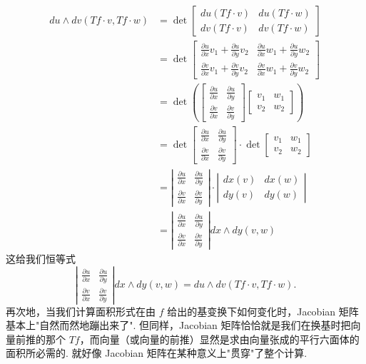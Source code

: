 \begin{align*}
du\wedge dv(Tf\cdot v,Tf\cdot w)
&=\det\begin{bmatrix}du(Tf\cdot v)&du(Tf\cdot w)\\dv(Tf\cdot v)&dv(Tf\cdot w)\end{bmatrix}\\
&=\det\begin{bmatrix}\frac{\partial u}{\partial x}v_1+\frac{\partial u}{\partial y}v_2&\frac{\partial u}{\partial x}w_1+\frac{\partial u}{\partial y}w_2\\[2pt]\frac{\partial v}{\partial x}v_1+\frac{\partial v}{\partial y}v_2&\frac{\partial v}{\partial x}w_1+\frac{\partial v}{\partial y}w_2\end{bmatrix}\\
&=\det\left(\begin{bmatrix}\frac{\partial u}{\partial x}&\frac{\partial u}{\partial y}\\\frac{\partial v}{\partial x}&\frac{\partial v}{\partial y}\end{bmatrix}\begin{bmatrix}v_1&w_1\\v_2&w_2\end{bmatrix}\right)\\
&=\det\begin{bmatrix}\frac{\partial u}{\partial x}&\frac{\partial u}{\partial y}\\\frac{\partial v}{\partial x}&\frac{\partial v}{\partial y}\end{bmatrix}\cdot\det\begin{bmatrix}v_1&w_1\\v_2&w_2\end{bmatrix}\\
&=\left|\begin{matrix}\frac{\partial u}{\partial x}&\frac{\partial u}{\partial y}\\\frac{\partial v}{\partial x}&\frac{\partial v}{\partial y}\end{matrix}\right|\cdot\left|\begin{matrix}dx(v)&dx(w)\\dy(v)&dy(w)\end{matrix}\right|\\
&=\left|\begin{matrix}\frac{\partial u}{\partial x}&\frac{\partial u}{\partial y}\\\frac{\partial v}{\partial x}&\frac{\partial v}{\partial y}\end{matrix}\right|dx\wedge dy(v,w)
\end{align*}
这给我们恒等式
\[
\left|\begin{matrix}\frac{\partial u}{\partial x}&\frac{\partial u}{\partial y}\\\frac{\partial v}{\partial x}&\frac{\partial v}{\partial y}\end{matrix}\right|dx\wedge dy(v,w)
=du\wedge dv(Tf\cdot v,Tf\cdot w).
\]
再次地，当我们计算面积形式在由 $f$ 给出的基变换下如何变化时，Jacobian 矩阵基本上"自然而然地蹦出来了". 但同样，Jacobian 矩阵恰恰就是我们在换基时把向量前推的那个 $Tf$，而向量（或向量的前推）显然是求由向量张成的平行六面体的面积所必需的. 就好像 Jacobian 矩阵在某种意义上"贯穿"了整个计算.

